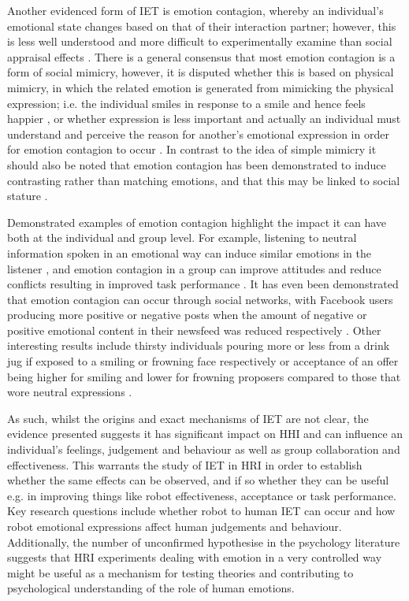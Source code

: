 \documentclass[11pt,a4paper]{report}
\begin{document}
Another evidenced form of IET is emotion contagion, whereby an individual's emotional state changes based on that of their interaction partner; however, this is less well understood and more difficult to experimentally examine than social appraisal effects \cite{parkinson2011interpersonal}. There is a general consensus that most emotion contagion is a form of social mimicry, however, it is disputed whether this is based on physical mimicry, in which the related emotion is generated from mimicking the physical expression; i.e. the individual smiles in response to a smile and hence feels happier \cite{strack1988inhibiting}, or whether expression is less important and actually an individual must understand and perceive the reason for another's emotional expression in order for emotion contagion to occur \cite{tamietto2009unseen}. In contrast to the idea of simple mimicry it should also be noted that emotion contagion has been demonstrated to induce contrasting rather than matching emotions, and that this may be linked to social stature \cite{tiedens2003power}.

Demonstrated examples of emotion contagion highlight the impact it can have both at the individual and group level. For example, listening to neutral information spoken in an emotional way can induce similar emotions in the listener \cite{neumann2000mood}, and emotion contagion in a group can improve attitudes and reduce conflicts resulting in improved task performance \cite{barsade2002ripple}. It has even been demonstrated that emotion contagion can occur through social networks, with Facebook users producing more positive or negative posts when the amount of negative or positive emotional content in their newsfeed was reduced respectively \cite{kramer2014experimental}. Other interesting results include thirsty individuals pouring more or less from a drink jug if exposed to a smiling or frowning face respectively \cite{winkielman2005unconscious} or acceptance of an offer being higher for smiling and lower for frowning proposers compared to those that wore neutral expressions \cite{mussel2013value}. 

As such, whilst the origins and exact mechanisms of IET are not clear, the evidence presented suggests it has significant impact on HHI and can influence an individual's feelings, judgement and behaviour as well as group collaboration and effectiveness. This warrants the study of IET in HRI in order to establish whether the same effects can be observed, and if so whether they can be useful e.g. in improving things like robot effectiveness, acceptance or task performance. Key research questions include whether robot to human IET can occur and how robot emotional expressions affect human judgements and behaviour. Additionally, the number of unconfirmed hypothesise in the psychology literature suggests that HRI experiments dealing with emotion in a very controlled way might be useful as a mechanism for testing theories and contributing to psychological understanding of the role of human emotions. 
\end{document}
